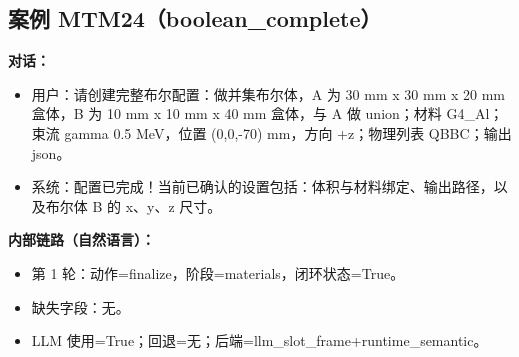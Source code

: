 \documentclass[11pt]{ctexart}
\begin{document}
\subsection{案例 MTM24（boolean\_complete）}
\textbf{对话：}
\begin{itemize}
\item 用户：请创建完整布尔配置：做并集布尔体，A 为 30 mm x 30 mm x 20 mm 盒体，B 为 10 mm x 10 mm x 40 mm 盒体，与 A 做 union；材料 G4\_Al；束流 gamma 0.5 MeV，位置 (0,0,-70) mm，方向 +z；物理列表 QBBC；输出 json。
\item 系统：配置已完成！当前已确认的设置包括：体积与材料绑定、输出路径，以及布尔体 B 的 x、y、z 尺寸。
\end{itemize}
\textbf{内部链路（自然语言）：}
\begin{itemize}
\item 第 1 轮：动作=finalize，阶段=materials，闭环状态=True。
\item 缺失字段：无。
\item LLM 使用=True；回退=无；后端=llm\_slot\_frame+runtime\_semantic。
\end{itemize}
\end{document}
